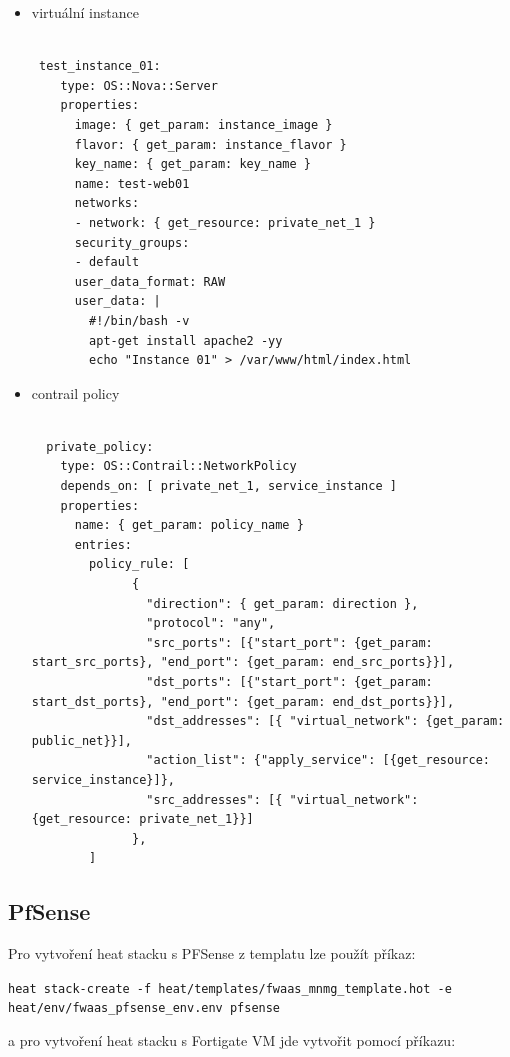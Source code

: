 \begin{itemize}
\item virtuální instance
\begin{lstlisting}[caption=Virtuální instance pro testování]

 test_instance_01:
    type: OS::Nova::Server
    properties:
      image: { get_param: instance_image }
      flavor: { get_param: instance_flavor }
      key_name: { get_param: key_name }
      name: test-web01
      networks:
      - network: { get_resource: private_net_1 }
      security_groups:
      - default
      user_data_format: RAW
      user_data: |
        #!/bin/bash -v
        apt-get install apache2 -yy
        echo "Instance 01" > /var/www/html/index.html

\end{lstlisting}

\item contrail policy

\begin{lstlisting}[caption=Contrail network policy]

  private_policy:
    type: OS::Contrail::NetworkPolicy
    depends_on: [ private_net_1, service_instance ]
    properties:
      name: { get_param: policy_name }
      entries:
        policy_rule: [
              { 
                "direction": { get_param: direction }, 
                "protocol": "any", 
                "src_ports": [{"start_port": {get_param: start_src_ports}, "end_port": {get_param: end_src_ports}}],
                "dst_ports": [{"start_port": {get_param: start_dst_ports}, "end_port": {get_param: end_dst_ports}}],
                "dst_addresses": [{ "virtual_network": {get_param: public_net}}], 
                "action_list": {"apply_service": [{get_resource: service_instance}]}, 
                "src_addresses": [{ "virtual_network": {get_resource: private_net_1}}] 
              }, 
        ]

\end{lstlisting}
\end{itemize}

\subsection{PfSense}\label{sub:interaction}

Pro vytvoření heat stacku s PFSense z templatu lze použít příkaz:

\verb!heat stack-create -f heat/templates/fwaas_mnmg_template.hot -e heat/env/fwaas_pfsense_env.env pfsense!

a pro vytvoření heat stacku s Fortigate VM jde vytvořit pomocí příkazu:

